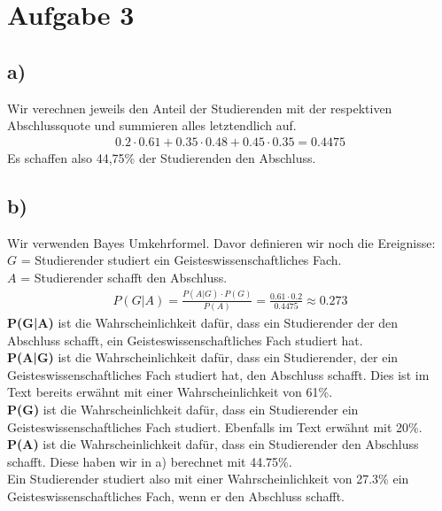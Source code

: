 \pagebreak
\section*{Aufgabe 3}
\subsection*{a)}
Wir verechnen jeweils den Anteil der Studierenden mit der respektiven Abschlussquote und summieren alles letztendlich auf.
\begin{align*}
  0.2 \cdot 0.61 + 0.35 \cdot 0.48 + 0.45 \cdot 0.35 = 0.4475
\end{align*}
Es schaffen also 44,75\% der Studierenden den Abschluss.
\subsection*{b)}
Wir verwenden Bayes Umkehrformel. Davor definieren wir noch die Ereignisse:\\
$G$ = Studierender studiert ein Geisteswissenschaftliches Fach. \\
$A$ = Studierender schafft den Abschluss. \\
\begin{align*}
  P(G|A) = \frac{P(A|G)\cdot P(G)}{P(A)} = \frac{0.61\cdot 0.2}{0.4475} \approx 0.273
\end{align*}
\textbf{P(G|A)} ist die Wahrscheinlichkeit dafür, dass ein Studierender der den Abschluss schafft, ein Geisteswissenschaftliches Fach studiert hat. \\
\textbf{P(A|G)} ist die Wahrscheinlichkeit dafür, dass ein Studierender, der ein Geisteswissenschaftliches Fach studiert hat, den Abschluss schafft. Dies ist im Text bereits erwähnt mit einer Wahrscheinlichkeit von 61\%. \\
\textbf{P(G)} ist die Wahrscheinlichkeit dafür, dass ein Studierender ein Geisteswissenschaftliches Fach studiert. Ebenfalls im Text erwähnt mit 20\%.\\
\textbf{P(A)} ist die Wahrscheinlichkeit dafür, dass ein Studierender den Abschluss schafft. Diese haben wir in a) berechnet mit 44.75\%. \\
Ein Studierender studiert also mit einer Wahrscheinlichkeit von 27.3\% ein Geisteswissenschaftliches Fach, wenn er den Abschluss schafft.

